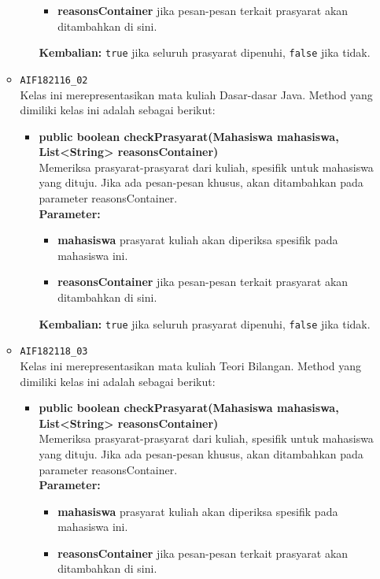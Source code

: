 \begin{enumerate}
\begin{itemize}
\begin{itemize}
\begin{itemize}
				\item \textbf{reasonsContainer} jika pesan-pesan terkait prasyarat akan ditambahkan di sini.
			\end{itemize}
			\textbf{Kembalian:} \texttt{true} jika seluruh prasyarat dipenuhi, \texttt{false} jika tidak.
		\end{itemize}
		\item \texttt{AIF182116\_02} \\
		Kelas ini merepresentasikan mata kuliah Dasar-dasar Java. Method yang dimiliki kelas ini adalah sebagai berikut: 
		\begin{itemize}
			\item \textbf{public boolean checkPrasyarat(Mahasiswa mahasiswa, List<String> reasonsContainer)}\\
			Memeriksa prasyarat-prasyarat dari kuliah, spesifik untuk mahasiswa yang dituju. Jika ada pesan-pesan khusus, akan ditambahkan pada parameter reasonsContainer.\\
			\textbf{Parameter:}
			\begin{itemize}
				\item \textbf{mahasiswa} prasyarat kuliah akan diperiksa spesifik pada mahasiswa ini.
				\item \textbf{reasonsContainer} jika pesan-pesan terkait prasyarat akan ditambahkan di sini.
			\end{itemize}
			\textbf{Kembalian:} \texttt{true} jika seluruh prasyarat dipenuhi, \texttt{false} jika tidak.
		\end{itemize}
		\item \texttt{AIF182118\_03} \\
		Kelas ini merepresentasikan mata kuliah Teori Bilangan. Method yang dimiliki kelas ini adalah sebagai berikut: 
		\begin{itemize}
			\item \textbf{public boolean checkPrasyarat(Mahasiswa mahasiswa, List<String> reasonsContainer)}\\
			Memeriksa prasyarat-prasyarat dari kuliah, spesifik untuk mahasiswa yang dituju. Jika ada pesan-pesan khusus, akan ditambahkan pada parameter reasonsContainer.\\
			\textbf{Parameter:}
			\begin{itemize}
				\item \textbf{mahasiswa} prasyarat kuliah akan diperiksa spesifik pada mahasiswa ini.
				\item \textbf{reasonsContainer} jika pesan-pesan terkait prasyarat akan ditambahkan di sini.

\end{itemize}
\end{itemize}
\end{itemize}
\end{enumerate}
